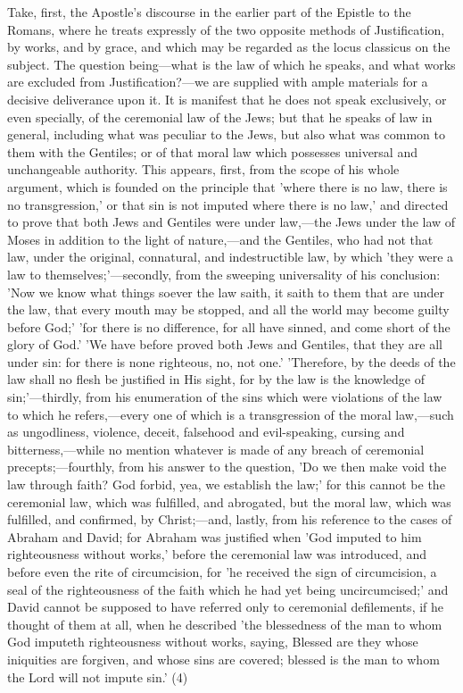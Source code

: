 \documentclass[
]{book}
\begin{document}
Take, first, the Apostle's discourse in the earlier part of the Epistle to the Romans, where he treats expressly of the two opposite methods of Justification, by works, and by grace, and which may be regarded as the locus classicus on the subject. The question being---what is the law of which he speaks, and what works are excluded from Justification?---we are supplied with ample materials for a decisive deliverance upon it. It is manifest that he does not speak exclusively, or even specially, of the ceremonial law of the Jews; but that he speaks of law in general, including what was peculiar to the Jews, but also what was common to them with the Gentiles; or of that moral law which possesses universal and unchangeable authority. This appears, first, from the scope of his whole argument, which is founded on the principle that 'where there is no law, there is no transgression,' or that sin is not imputed where there is no law,' and directed to prove that both Jews and Gentiles were under law,---the Jews under the law of Moses in addition to the light of nature,---and the Gentiles, who had not that law, under the original, connatural, and indestructible law, by which 'they were a law to themselves;'---secondly, from the sweeping universality of his conclusion: 'Now we know what things soever the law saith, it saith to them that are under the law, that every mouth may be stopped, and all the world may become guilty before God;' 'for there is no difference, for all have sinned, and come short of the glory of God.' 'We have before proved both Jews and Gentiles, that they are all under sin: for there is none righteous, no, not one.' 'Therefore, by the deeds of the law shall no flesh be justified in His sight, for by the law is the knowledge of sin;'---thirdly, from his enumeration of the sins which were violations of the law to which he refers,---every one of which is a transgression of the moral law,---such as ungodliness, violence, deceit, falsehood and evil-speaking, cursing and bitterness,---while no mention whatever is made of any breach of ceremonial precepts;---fourthly, from his answer to the question, 'Do we then make void the law through faith? God forbid, yea, we establish the law;' for this cannot be the ceremonial law, which was fulfilled, and abrogated, but the moral law, which was fulfilled, and confirmed, by Christ;---and, lastly, from his reference to the cases of Abraham and David; for Abraham was justified when 'God imputed to him righteousness without works,' before the ceremonial law was introduced, and before even the rite of circumcision, for 'he received the sign of circumcision, a seal of the righteousness of the faith which he had yet being uncircumcised;' and David cannot be supposed to have referred only to ceremonial defilements, if he thought of them at all, when he described 'the blessedness of the man to whom God imputeth righteousness without works, saying, Blessed are they whose iniquities are forgiven, and whose sins are covered; blessed is the man to whom the Lord will not impute sin.' (4)
\end{document}
